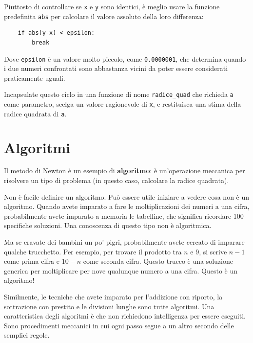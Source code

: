\documentclass[10pt]{book}
\begin{document}
Piuttosto di controllare se {\tt x} e {\tt y} sono identici, è meglio usare la funzione predefinita {\tt abs} per calcolare il valore assoluto della loro differenza:

\begin{verbatim}
    if abs(y-x) < epsilon:
        break
\end{verbatim}
%
Dove \verb"epsilon" è un valore molto piccolo, come {\tt 0.0000001}, che determina quando i due numeri confrontati sono abbastanza vicini da poter essere considerati praticamente uguali.

\vspace{0.2in}
\begin{exercise}

Incapsulate questo ciclo in una funzione di nome \verb"radice_quad"
che richieda {\tt a} come parametro, scelga un valore ragionevole di {\tt x}, e restituisca una stima della radice quadrata di {\tt a}.

\end{exercise}


\section{Algoritmi}

Il metodo di Newton è un esempio di {\bf algoritmo}: è un'operazione meccanica per risolvere un tipo di problema (in questo caso, calcolare la radice quadrata).

Non è facile definire un algoritmo. Può essere utile iniziare a vedere cosa non è un algoritmo. Quando avete imparato a fare le moltiplicazioni dei numeri a una cifra, probabilmente avete imparato a memoria le tabelline, che significa ricordare 100 specifiche soluzioni. Una conoscenza di questo tipo non è algoritmica.

Ma se eravate dei bambini un po' pigri, probabilmente avete cercato di imparare qualche trucchetto. Per esempio, per trovare il prodotto tra $n$ e 9, si scrive $n-1$ come prima cifra e $10-n$ come seconda cifra. Questo trucco è una soluzione generica per moltiplicare per nove qualunque numero a una cifra. Questo è un algoritmo!

Similmente, le tecniche che avete imparato per l'addizione con riporto, la sottrazione con prestito e le divisioni lunghe sono tutte algoritmi. Una caratteristica degli algoritmi è che non richiedono intelligenza per essere eseguiti. Sono procedimenti meccanici in cui ogni passo segue a un altro secondo delle semplici regole.
\end{document}
